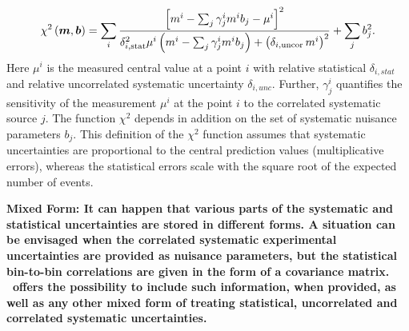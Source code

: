 \begin{description}
{ \small
\begin{equation} 
    \chi^2\left(\boldsymbol{m},\boldsymbol{b}\right) =   
 \sum_i \frac{\left[m^i - \sum_j \gamma^i_j m^i b_j  - {\mu^i} \right]^2}
{ \textstyle \delta^2_{i,{\rm stat}}\mu^i \left(m^i -  \sum_j \gamma^i_j m^i b_j\right)
  + \left(\delta_{i,{\rm uncor}}\,  m^i\right)^2}+ \sum_j b^2_j.
\label{eq:aven}
\end{equation}}
%
Here ${\mu^i}$ is the  measured central value  at a point $i$ 
with  relative statistical $\delta_{i,stat}$ 
and relative uncorrelated systematic uncertainty $\delta_{i,unc}$.
Further, 
$\gamma^i_j$ 
quantifies the sensitivity of the
measurement ${\mu^i}$ at the point $i$ to the correlated systematic 
source $j$. The function $\chi^2$ depends in addition on
 the set of systematic nuisance parameters $b_j$.
This definition of the $\chi^2$ function assumes that
systematic uncertainties are proportional to the central prediction values
(multiplicative errors), whereas the statistical errors scale 
with the square root of the expected number of events. 
\item  \bf{Mixed Form:} \rm
It can happen that various parts of the systematic and statistical uncertainties are stored in different forms. A situation can be envisaged when the correlated systematic experimental uncertainties are provided as nuisance parameters, but the statistical bin-to-bin correlations are given in the form of a covariance matrix. \fitter\ offers the possibility to include such information, when provided, as well as any other mixed form of treating statistical, uncorrelated and correlated systematic uncertainties. 
\end{description}


